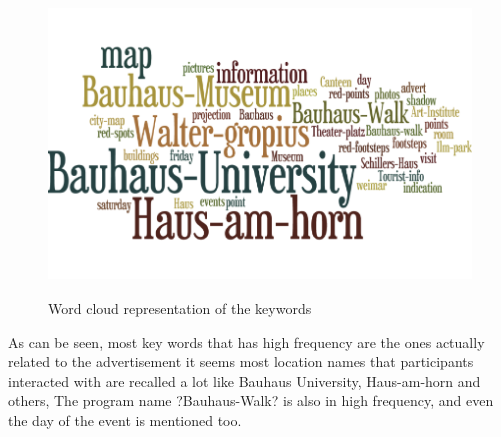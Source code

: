 \begin{figure}[H]
\centering
\includegraphics[width=12cm,height=8cm]{Figures/6/wordle}%
 \caption{Word cloud representation of the keywords}%
 \label{fig:wordle}%
\end{figure}

As can be seen, most key words that has high frequency are the ones actually related to the advertisement it seems most location names that participants interacted with are recalled a lot like Bauhaus University, Haus-am-horn and others, The program name ?Bauhaus-Walk? is also in high frequency, and even the day of the event is mentioned too.


